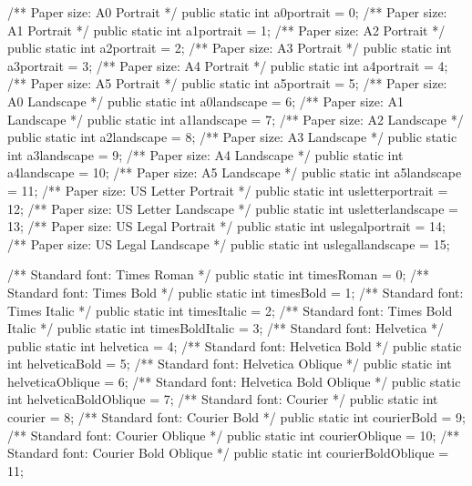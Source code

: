 /** Paper size: A0 Portrait */
public static int a0portrait = 0;
/** Paper size: A1 Portrait */
public static int a1portrait = 1;
/** Paper size: A2 Portrait */
public static int a2portrait = 2;
/** Paper size: A3 Portrait */
public static int a3portrait = 3;
/** Paper size: A4 Portrait */
public static int a4portrait = 4;
/** Paper size: A5 Portrait */
public static int a5portrait = 5;
/** Paper size: A0 Landscape */
public static int a0landscape = 6;
/** Paper size: A1 Landscape */
public static int a1landscape = 7;
/** Paper size: A2 Landscape */
public static int a2landscape = 8;
/** Paper size: A3 Landscape */
public static int a3landscape = 9;
/** Paper size: A4 Landscape */
public static int a4landscape = 10;
/** Paper size: A5 Landscape */
public static int a5landscape = 11;
/** Paper size: US Letter Portrait */
public static int usletterportrait = 12;
/** Paper size: US Letter Landscape */
public static int usletterlandscape = 13;
/** Paper size: US Legal Portrait */
public static int uslegalportrait = 14;
/** Paper size: US Legal Landscape */
public static int uslegallandscape = 15;

/** Standard font: Times Roman */
public static int timesRoman = 0;
/** Standard font: Times Bold */
public static int timesBold = 1;
/** Standard font: Times Italic */
public static int timesItalic = 2;
/** Standard font: Times Bold Italic */
public static int timesBoldItalic = 3;
/** Standard font: Helvetica */
public static int helvetica = 4;
/** Standard font: Helvetica Bold */
public static int helveticaBold = 5;
/** Standard font: Helvetica Oblique */
public static int helveticaOblique = 6;
/** Standard font: Helvetica Bold Oblique */
public static int helveticaBoldOblique = 7;
/** Standard font: Courier */
public static int courier = 8;
/** Standard font: Courier Bold */
public static int courierBold = 9;
/** Standard font: Courier Oblique */
public static int courierOblique = 10;
/** Standard font: Courier Bold Oblique */
public static int courierBoldOblique = 11;

